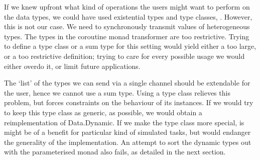 


If we knew upfront what kind of operations the users might want to perform on the data types, we could have used existential types and type classes, \viz \cite{Laufer:1994:PTI:186025.186031,Kiselyov:2004:STH:1017472.1017488}.
However, this is not our case.
We need to synchronously transmit values of heterogeneous types.
The types in the coroutine monad transformer are too restrictive.
Trying to define a type class or a sum type for this setting would yield either a too large, or a too restrictive definition; trying to care for every possible usage we would either overdo it, or limit  future applications.

The `list' of the types we can send via a single channel should be extendable for the user, hence we cannot use a sum type.
Using a type class relieves this problem, but forces constraints on the behaviour of its instances.
If we would try to keep this type class as generic, as possible, we would obtain a reimplementation of \textsf{Data.Dynamic}.
If we make the type class more special, is might be of a benefit for particular kind of simulated tasks, but would endanger the generality of the implementation.
An attempt to sort the dynamic types out with the parameterised monad also fails, as detailed in the next section.

